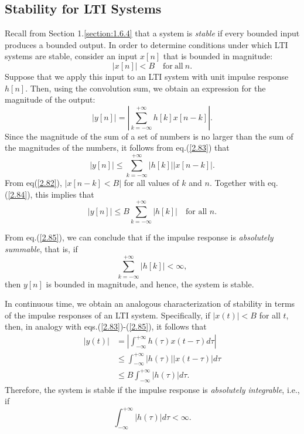 \documentclass[a4paper,twoside]{book}
\begin{document}
\subsection{Stability for LTI Systems}
\label{section:2.3.7}

Recall from Section 1.\ref{section:1.6.4} that a system is \textit{stable} if every bounded input produces a bounded output. In order to determine conditions under which LTI systems are stable, consider an input $x[n]$ that is bounded in magnitude:
\begin{equation}
    |x[n]|<B\quad\mathrm{for~all~}n.
    \label{2.82}
\end{equation}
Suppose that we apply this input to an LTI system with unit impulse response $h[n]$. Then, using the convolution sum, we obtain an expression for the magnitude of the output:
\begin{equation}
    \left|y[n]\right|=\left|\sum_{k=-\infty}^{+\infty}h[k]x[n-k]\right|.
    \label{2.83}
\end{equation}
Since the magnitude of the sum of a set of numbers is no larger than the sum of the magnitudes of the numbers, it follows from eq.\;(\ref{2.83}) that
\begin{equation}
    |y[n]|\leq\sum_{k=-\infty}^{+\infty}|h[k]||x[n-k]|.
    \label{2.84}
\end{equation}
From eq\;(\ref{2.82}), $|x[n-k]<B|$ for all values of $k$ and $n$. Together with eq.\;(\ref{2.84}), this implies that
\begin{equation}
    |y[n]|\leq B\sum_{k=-\infty}^{+\infty}|h[k]|\quad\text{for all }n.
    \label{2.85}
\end{equation}

From eq.\;(\ref{2.85}), we can conclude that if the impulse response is \textit{absolutely summable}, that is, if
\begin{equation}
    \sum_{k=-\infty}^{+\infty}|h[k]|<\infty,
    \label{2.86}
\end{equation}
then $y[n]$ is bounded in magnitude, and hence, the system is stable.

In continuous time, we obtain an analogous characterization of stability in terms of the impulse responses of an LTI system. Specifically, if $|x(t)|<B$ for all $t$, then, in analogy with eqs.\;(\ref{2.83})-(\ref{2.85}), it follows that $$\begin{aligned}|y(t)|&=\left|\int_{-\infty}^{+\infty}h(\tau)x(t-\tau)d\tau\right|\\&\leq\int_{-\infty}^{+\infty}|h(\tau)||x(t-\tau)|d\tau\\&\leq B\int_{-\infty}^{+\infty}|h(\tau)|d\tau.\end{aligned}$$ Therefore, the system is stable if the impulse response is \textit{absolutely integrable}, i.e., if
\begin{equation}
    \int_{-\infty}^{+\infty}|h(\tau)|d\tau<\infty.
    \label{2.87}
\end{equation}
\end{document}
